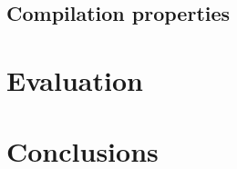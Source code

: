 \documentclass{article}
\begin{document}
\subsection{Compilation properties}


\section{Evaluation}



\section{Conclusions}





\end{document}
